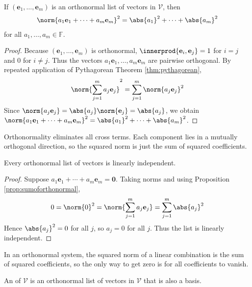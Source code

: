 \begin{proposition} \label{prop:sumoforthonormal} If $(\mathbf{e}_1, \ldots, \mathbf{e}_m)$ is an orthonormal list of vectors in $\mathcal{V}$, then
\begin{align}
\norm{a_1 \mathbf{e}_1 + \cdots + a_m \mathbf{e}_m}^2 = \abs{a_1}^2 + \cdots + \abs{a_m}^2 \nonumber
\end{align}
for all $a_1, \ldots, a_m \in \mathbb{F}$.
\begin{proof} Because $(\mathbf{e}_1, \ldots, \mathbf{e}_m)$ is orthonormal, $\innerprod{\mathbf{e}_i, \mathbf{e}_j} = 1$ for $i=j$ and $0$ for $i \neq j$. Thus the vectors $a_1 \mathbf{e}_1, \ldots, a_m \mathbf{e}_m$ are pairwise orthogonal. By repeated application of Pythagorean Theorem \ref{thm:pythagorean},
\begin{align}
\norm{\sum\limits_{j=1}^m a_j \mathbf{e}_j}^2 = \sum\limits_{j=1}^m \norm{a_j \mathbf{e}_j}^2 \nonumber
\end{align}
Since $\norm{a_j \mathbf{e}_j} = \abs{a_j} \norm{\mathbf{e}_j} = \abs{a_j}$, we obtain $\norm{a_1 \mathbf{e}_1 + \cdots + a_m \mathbf{e}_m}^2 = \abs{a_1}^2 + \cdots + \abs{a_m}^2$.
\end{proof}
\end{proposition}

Orthonormality eliminates all cross terms. Each component lies in a mutually orthogonal direction, so the squared norm is just the sum of squared coefficients.

\begin{corollary} \label{cor:orthonormallistisindep} Every orthonormal list of vectors is linearly independent.
\begin{proof} Suppose $a_1 \mathbf{e}_1 + \cdots + a_m \mathbf{e}_m = \mathbf{0}$. Taking norms and using Proposition \ref{prop:sumoforthonormal},
\begin{align}
0 = \norm{0}^2 = \norm{\sum\limits_{j=1}^m a_j \mathbf{e}_j} = \sum\limits_{j=1}^m \abs{a_j}^2 \nonumber
\end{align}
Hence $\abs{a_j}^2 = 0$ for all $j$, so $a_j = 0$ for all $j$. Thus the list is linearly independent.
\end{proof}
\end{corollary}

In an orthonormal system, the squared norm of a linear combination is the sum of squared coefficients, so the only way to get zero is for all coefficients to vanish.

\begin{definition} An  of $\mathcal{V}$ is an orthonormal list of vectors in $\mathcal{V}$ that is also a basis.
\end{definition}

